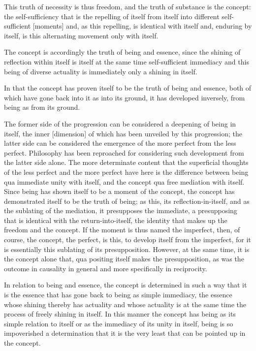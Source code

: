This truth of necessity is thus freedom, and
the truth of substance is the concept:
the self-sufficiency that is the repelling of itself from itself into
different self-sufficient [moments] and, as this repelling, is
identical with itself and, enduring by itself, is
this alternating movement only with itself.

The concept is accordingly the truth of being and essence,
since the shining of reflection within itself is
itself at the same time self-sufficient immediacy
and this being of diverse actuality is immediately
only a shining in itself.

In that the concept has proven itself to be
the truth of being and essence,
both of which have gone back into it
as into its ground, it has developed inversely,
from being as from its ground.

The former side of the progression can be considered
a deepening of being in itself,
the inner [dimension] of which
has been unveiled by this progression;
the latter side can be considered the emergence
of the more perfect from the less perfect.
Philosophy has been reproached for considering
such development from the latter side alone.
The more determinate content that the superficial thoughts
of the less perfect and the more perfect have here is
the difference between being qua immediate unity with itself,
and the concept qua free mediation with itself.
Since being has shown itself to be a moment of the concept,
the concept has demonstrated itself to be the truth of being;
as this, its reflection-in-itself,
and as the sublating of the mediation,
it presupposes the immediate,
a presupposing that is identical with the return-into-itself,
the identity that makes up the freedom and the concept.
If the moment is thus named the imperfect, then,
of course, the concept, the perfect, is this,
to develop itself from the imperfect,
for it is essentially this sublating of its presupposition.
However, at the same time, it is the concept alone that,
qua positing itself makes the presupposition,
as was the outcome in causality in general
and more specifically in reciprocity.

In relation to being and essence, the concept is determined
in such a way that it is the essence that has gone back to being
as simple immediacy, the essence whose shining thereby has actuality and
whose actuality is at the same time the process of freely shining in itself.
In this manner the concept has being as its simple relation
to itself or as the immediacy of its unity in itself,
being is so impoverished a determination that it is
the very least that can be pointed up in the concept.

